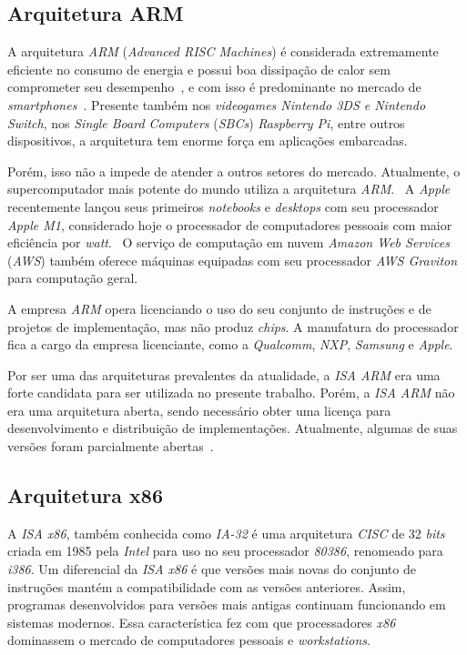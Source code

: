     \subsection{Arquitetura ARM}
    { A arquitetura \textit{ARM} (\textit{Advanced RISC Machines}) é considerada
        extremamente eficiente no consumo de energia e possui boa dissipação de
        calor sem comprometer seu desempenho~\cite{arm_facts1988}, e com isso é
        predominante no mercado de \textit{smartphones}~\cite{arm_milestone}.
        Presente também nos \textit{videogames Nintendo 3DS e Nintendo Switch},
        nos \textit{Single Board Computers} (\textit{SBCs}) \textit{Raspberry Pi},
        entre outros dispositivos, a arquitetura tem enorme força em aplicações
        embarcadas.
    }

    { Porém, isso não a impede de atender a outros setores do mercado. Atualmente,
        o supercomputador mais potente do mundo utiliza a arquitetura
        \textit{ARM}.~\cite{arm_super} A \textit{Apple} recentemente lançou seus
        primeiros \textit{notebooks} e \textit{desktops} com seu processador
        \textit{Apple M1}, considerado hoje o processador de computadores pessoais
        com maior eficiência por \textit{watt}.~\cite{arm_m1} O serviço de
        computação em nuvem \textit{Amazon Web Services} (\textit{AWS})
        também oferece máquinas equipadas com seu processador \textit{AWS Graviton}
        para computação geral.
    }

    { A empresa \textit{ARM} opera licenciando o uso do seu conjunto de instruções
        e de projetos de implementação, mas não produz \textit{chips}. A manufatura
        do processador fica a cargo da empresa licenciante, como a \textit{Qualcomm},
        \textit{NXP}, \textit{Samsung} e \textit{Apple}.
    }

    { Por ser uma das arquiteturas prevalentes da atualidade, a \textit{ISA ARM}
        era uma forte candidata para ser utilizada no presente trabalho. Porém,
        a \textit{ISA ARM} não era uma arquitetura aberta, sendo necessário obter
        uma licença para desenvolvimento e distribuição de implementações.
        Atualmente, algumas de suas versões foram parcialmente abertas~\cite{arm_open}.
    }

    \subsection{Arquitetura x86}
    { A \textit{ISA x86}, também conhecida como \textit{IA-32} é uma arquitetura
        \textit{CISC} de 32 \textit{bits} criada em 1985 pela \textit{Intel}
        para uso no seu processador \textit{80386}, renomeado para \textit{i386}.
        Um diferencial da \textit{ISA x86} é que versões mais novas do conjunto
        de instruções mantém a compatibilidade com as versões anteriores.
        Assim, programas desenvolvidos para versões mais antigas continuam
        funcionando em sistemas modernos. Essa característica fez com que
        processadores \textit{x86} dominassem o mercado de computadores pessoais
        e \textit{workstations}.
    }

